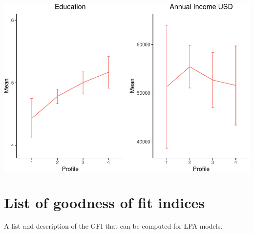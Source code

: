 \documentclass[]{article}
\begin{document}
\includegraphics{lpa_analyses_files/figure-latex/unnamed-chunk-19-1.pdf}

\newpage

\hypertarget{list-of-goodness-of-fit-indices}{%
\section{List of goodness of fit
indices}\label{list-of-goodness-of-fit-indices}}

A list and description of the GFI that can be computed for LPA models.
\end{document}
